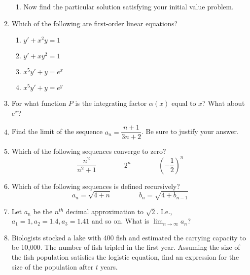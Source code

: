 \documentclass{nosvagor-notes}
\begin{document}
\begin{enumerate}
\begin{enumerate}
      \item Now find the particular solution satisfying your initial value problem.
        \vspace{140pt}
    \end{enumerate}

  \item Which of the following are first-order linear equations?
    \begin{multicols}{2}
    \begin{enumerate}
      \item \(y' + x^2y = 1\)
      \item \(y' + xy^2 = 1\)
      \item \(x^5y' + y = e^x\)
      \item \(x^5y' + y = e^y\)
    \end{enumerate}
    \end{multicols}
    \vspace{80pt}

  \item For what function \(P\) is the integrating factor \(\alpha (x) \) equal
    to \(x?\) What about \(e^x\)?
  \newpage

  \newpage

  \item Find the limit of the sequence \(a_n = \dfrac{n+1}{3n+2}\). Be sure to justify your answer.
  \vspace{256pt}

  \item Which of the following sequences converge to zero?
    \[%
      \frac{n^2}{n^2+1} \qquad\qquad 2^n \qquad\qquad \left( -\frac{1}{2} \right) ^n
    \]%
    \vspace{40pt}

  \item Which of the following sequences is defined recursively?
    \[%
    a_n = \sqrt{4+n} \qquad \qquad b_n = \sqrt{4+b_{n-1}}
    \]%
    \vspace{40pt}

  \item Let \(a_n\) be the \(n^{th}\) decimal approximation to \(\sqrt{2} \).
    I.e., \(a_1 = 1, a_2 = 1.4, a_3 = 1.41\) and so on. What is \(\lim_{n \to
    \infty} a_n\)?
  \newpage

  \item Biologists stocked a lake with 400 fish and estimated the carrying
    capacity to be 10,000. The number of fish tripled in the first year.
    Assuming the size of the fish population satisfies the logistic equation,
    find an expression for the size of the population after \(t\) years.


\end{enumerate}
\end{document}
